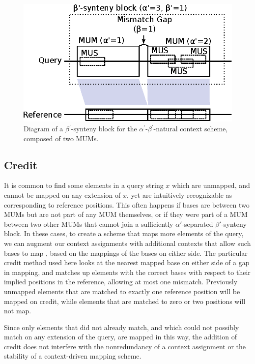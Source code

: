 \begin{figure}
\centering
  \includegraphics[width=1.0\columnwidth]{figures/02_contextschemes/MUMs.eps}
  \caption{Diagram of a $\beta^\prime$-synteny block for the $\alpha^\prime$-$\beta^\prime$-natural context scheme, composed of two MUMs.}
  \label{fig:model}
\end{figure}

\subsection{Credit}

It is common to find some elements in a query string $x$ which are unmapped, and cannot be mapped on any extension of $x$, yet are intuitively recognizable as corresponding to reference positions. This often happens if bases are between two MUMs but are not part of any MUM themselves, or if they were part of a MUM between two other MUMs that cannot join a sufficiently $\alpha'$-separated $\beta'$-synteny block. In these cases, to create a scheme that maps more elements of the query,  we can augment our context assignments with additional contexts that allow such bases to map , based on the mappings of the bases on either side. The particular credit method used here looks at the nearest mapped base on either side of a gap in mapping, and matches up elements with the correct bases with respect to their implied positions in the reference, allowing at most one mismatch. Previously unmapped elements that are matched to exactly one reference position will be mapped on credit, while elements that are matched to zero or two positions will not map.

Since only elements that did not already match, and which could not possibly match on any extension of the query, are mapped in this way, the addition of credit does not interfere with the nonredundancy of a context assignment or the stability of a context-driven mapping scheme.

